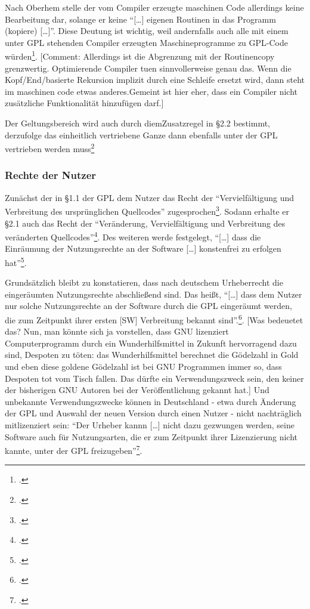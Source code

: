 \documentclass[DIV=calc,BCOR=5mm,11pt,headings=small,oneside,abstract=true, toc=bib]{scrartcl}
\begin{document}
Nach Oberhem stelle der vom Compiler erzeugte maschinen Code allerdings keine
Bearbeitung dar, solange er keine \enquote{[\ldots] eigenen Routinen in das
Programm (kopiere) [\ldots]}. Diese Deutung ist wichtig, weil andernfalls
auch alle mit einem unter GPL stehenden Compiler erzeugten Maschineprogramme zu
GPL-Code würden\footcite[vgl.][36]{Oberhem2008a}. [Comment: Allerdings ist die
Abgrenzung mit der Routinencopy grenzwertig. Optimierende Compiler tuen
sinnvollerweise genau das. Wenn die Kopf/End/basierte Rekursion implizit durch
eine Schleife ersetzt wird, dann steht im maschinen code etwas anderes.Gemeint
ist hier eher, dass ein Compiler nicht zusätzliche Funktionalität hinzufügen
darf.]

Der Geltungsbereich wird auch durch diemZusatzregel in §2.2 bestimmt, derzufolge
das einheitlich vertriebene Ganze dann ebenfalls unter der GPL vertrieben werden
muss\footcite[vgl.][37]{Oberhem2008a}

\subsubsection{Rechte der Nutzer}

Zunächst der in §1.1 der GPL dem Nutzer das Recht der
\enquote{Vervielfältigung und Verbreitung des ursprünglichen Quellcodes}
zugesprochen\footcite[vgl.][38]{Oberhem2008a}. Sodann erhalte er §2.1 auch das
Recht der \enquote{Veränderung, Vervielfältigung und Verbreitung des veränderten
Quellcodes}\footcite[vgl.][39]{Oberhem2008a}. Des weiteren werde
festgelegt, \enquote{[\ldots] dass die Einräumung der Nutzungsrechte an der
Software [\ldots] konstenfrei zu erfolgen
hat}\footcite[vgl.][41]{Oberhem2008a}.

Grundsätzlich bleibt zu konstatieren, dass nach deutschem Urheberrecht die
eingeräumten Nutzungsrechte abschließend sind. Das heißt, \enquote{[\ldots]
dass dem Nutzer nur solche Nutzungsrechte an der Software durch die GPL
eingeräumt werden, die zum Zeitpunkt ihrer ersten [SW] Verbreitung bekannt
sind}.\footcite[vgl.][41]{Oberhem2008a}. [Was bedeuetet das? Nun, man
könnte sich ja vorstellen, dass GNU lizenziert Computerprogramm durch ein
Wunderhilfsmittel in Zukunft hervorragend dazu sind, Despoten zu töten: das
Wunderhilfsmittel berechnet die Gödelzahl in Gold und eben diese
goldene Gödelzahl ist bei GNU Programmen immer so, dass Despoten tot vom Tisch
fallen. Das dürfte ein Verwendungszweck sein, den keiner der bisherigen GNU
Autoren bei der Veröffentlichung gekannt hat.]  Und unbekannte Verwendungszwecke
können in Deutschland - etwa durch Änderung der GPL und Auswahl der neuen
Version durch einen Nutzer - nicht nachträglich mitlizenziert sein:
\enquote{Der Urheber kannn [\ldots] nicht dazu gezwungen werden, seine
Software auch für Nutzungsarten, die er zum Zeitpunkt ihrer Lizenzierung
nicht kannte, unter der GPL freizugeben}\footcite[vgl.][43]{Oberhem2008a}.
\end{document}
